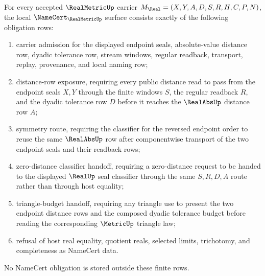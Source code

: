 \begin{theorem}
\label{thm:real-metric-namecert-obligations}
For every accepted $\RealMetricUp$ carrier $M_{\Real}=(X,Y,A,D,S,R,H,C,P,N)$, the local $\NameCert_{\RealMetricUp}$ surface consists exactly of the following obligation rows:
\begin{enumerate}
\item carrier admission for the displayed endpoint seals, absolute-value distance row, dyadic tolerance row, stream windows, regular readback, transport, replay, provenance, and local naming row;
\item distance-row exposure, requiring every public distance read to pass from the endpoint seals $X,Y$ through the finite windows $S$, the regular readback $R$, and the dyadic tolerance row $D$ before it reaches the $\RealAbsUp$ distance row $A$;
\item symmetry route, requiring the classifier for the reversed endpoint order to reuse the same $\RealAbsUp$ row after componentwise transport of the two endpoint seals and their readback rows;
\item zero-distance classifier handoff, requiring a zero-distance request to be handed to the displayed $\RealUp$ seal classifier through the same $S,R,D,A$ route rather than through host equality;
\item triangle-budget handoff, requiring any triangle use to present the two endpoint distance rows and the composed dyadic tolerance budget before reading the corresponding $\MetricUp$ triangle law;
\item refusal of host real equality, quotient reals, selected limits, trichotomy, and completeness as NameCert data.
\end{enumerate}
No NameCert obligation is stored outside these finite rows.
\end{theorem}
